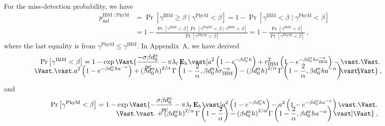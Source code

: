 \documentclass[12pt, draftclsnofoot, onecolumn]{IEEEtran}
\begin{document}
For the miss-detection probability, we have
\begin{align}\label{eq: miss-detection-uWave-Rayleigh-1}
p_{\mathrm{md}}^{{\mathrm{IBM}} \mid {\mathrm{PhyM}}}  &= \Pr \left[\gamma^{\mathrm{IBM}} \geq \beta \mid \gamma^{\mathrm{PhyM}} < \beta \right] = 1 - \Pr \left[\gamma^{\mathrm{IBM}} < \beta \mid \gamma^{\mathrm{PhyM}} < \beta \right] \nonumber \\
& = 1 - \frac{\Pr \left[\gamma^{\mathrm{IBM}} < \beta \right] \Pr \left[\gamma^{\mathrm{PhyM}} < \beta \mid \gamma^{\mathrm{IBM}} < \beta \right]}{\Pr \left[\gamma^{\mathrm{PhyM}} < \beta \right]} = 1 - \frac{\Pr \left[\gamma^{\mathrm{IBM}} < \beta \right]}{\Pr \left[\gamma^{\mathrm{PhyM}} < \beta \right]} \:,
\end{align}
where the last equality is from $\gamma^{\mathrm{PhyM}} \leq \gamma^{\mathrm{IBM}}$. In Appendix~A, we have derived
\begin{align}\label{eq: IBM1-1}
\hspace{-3mm}\Pr\left[\gamma^{\mathrm{IBM}} < \beta \right]  & = 1 - \exp\Vast\{ \frac{- \sigma \beta d_{0}^{\alpha}}{pc} -\pi \lambda_t  \, \mathbf{E}_h \vast[ a^2 \left( 1 - e^{- \beta d_{0}^{\alpha} h} \right) + r_{\mathrm{IBM}}^2 \left( 1 - e^{- \beta d_{0}^{\alpha} h r_{\mathrm{IBM}}^{-\alpha}} \right) -
\vast. \Vast. \nonumber \\[-5mm]
& \hspace{-25mm} \Vast. \vast.  a^2 \left( 1 - e^{- \beta d_{0}^{\alpha} h a^{-\alpha}} \right) + \left( \beta d_{0}^{\alpha} h \right)^{2/\alpha} \Gamma\left( 1 - \frac{2}{\alpha}, \beta d_{0}^{\alpha} h r_{\mathrm{IBM}}^{-\alpha} \right)
- \left( \beta d_{0}^{\alpha} h \right)^{2/\alpha} \Gamma\left( 1 - \frac{2}{\alpha}, \beta d_{0}^{\alpha} h a^{-\alpha} \right)  \hspace{-1.5mm} \vast] \hspace{-1.5mm} \Vast\}  \:,
\end{align}
and
\begin{align}\label{eq: PhyM1-1}
\Pr \left[\gamma^{\mathrm{PhyM}} < \beta \right] &= 1 - \exp\Vast\{ - \frac{\sigma \beta d_{0}^{\alpha}}{pc} - \pi \lambda_t  \, \mathbf{E}_h \vast[ a^2 \left( 1 - e^{- \beta d_{0}^{\alpha} h} \right) - a^2 \left( 1 - e^{- \beta d_{0}^{\alpha} h a^{-\alpha}} \right) \vast. \Vast. \nonumber \\[-5mm]
& \hspace{10mm} \Vast. \vast. + \left( \beta d_{0}^{\alpha} h \right)^{2/\alpha} \Gamma\left( 1 - \frac{2}{\alpha} \right)
- \left( \beta d_{0}^{\alpha} h \right)^{2/\alpha} \Gamma\left( 1 - \frac{2}{\alpha}, \beta d_{0}^{\alpha} h a^{-\alpha} \right) \vast] \Vast\}  \:,
\end{align}
\end{document}
